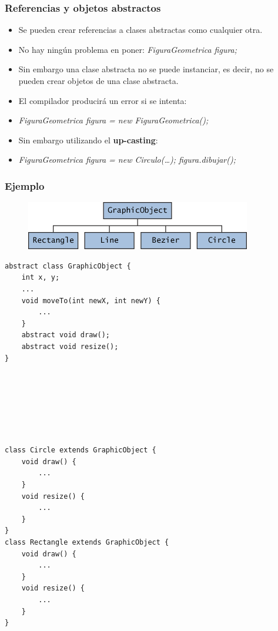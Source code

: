 \documentclass{beamer}
\begin{document}
 
\begin{frame}[fragile]
\frametitle{Referencias y objetos abstractos}
\begin{itemize}[<+->]
\item Se pueden crear referencias a clases abstractas como cualquier otra.
\item No hay ningún problema en poner: \emph{FiguraGeometrica figura;}
\item Sin embargo una clase abstracta no se puede instanciar, es decir, no se pueden crear objetos de una clase abstracta. 
\item El compilador producirá un error si se intenta:
\item \emph{FiguraGeometrica figura = new FiguraGeometrica();}
\item Sin embargo utilizando el \textbf{up-casting}: 
\item \emph{FiguraGeometrica figura = new Circulo(\dots); figura.dibujar();}
\end{itemize}
\end{frame}

\begin{frame}[fragile]
\frametitle{Ejemplo}
\begin{figure}
\includegraphics[scale=0.5]{imagenes/abstract1.png}
\end{figure}
\begin{tiny}
\begin{multicols}{2}
\begin{verbatim}
abstract class GraphicObject {
    int x, y;
    ...
    void moveTo(int newX, int newY) {
        ...
    }
    abstract void draw();
    abstract void resize();
}







class Circle extends GraphicObject {
    void draw() {
        ...
    }
    void resize() {
        ...
    }
}
class Rectangle extends GraphicObject {
    void draw() {
        ...
    }
    void resize() {
        ...
    }
}
\end{verbatim}
\end{multicols}
\end{tiny}
\end{frame}
\end{document}
